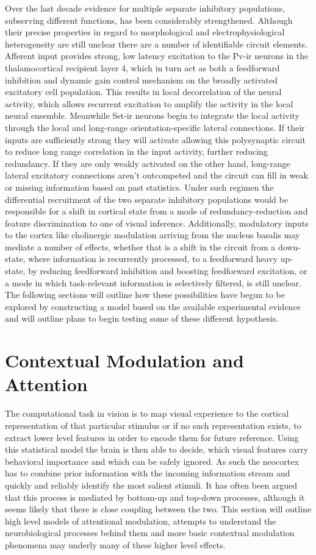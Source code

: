 Over the last decade evidence for multiple separate inhibitory
populations, subserving different functions, has been considerably
strengthened. Although their precise properties in regard to
morphological and electrophysiological heterogeneity are still unclear
there are a number of identifiable circuit elements. Afferent input
provides strong, low latency excitation to the Pv-ir neurons in the
thalamocortical recipient layer 4, which in turn act as both a
feedforward inhibition and dynamic gain control mechanism on the
broadly activated excitatory cell population. This results in local
decorrelation of the neural activity, which allows recurrent
excitation to amplify the activity in the local neural
ensemble. Meanwhile Sst-ir neurons begin to integrate the local
activity through the local and long-range orientation-specific lateral
connections. If their inputs are sufficiently strong they will
activate allowing this polysynaptic circuit to reduce long range
correlation in the input activity, further reducing redundancy. If
they are only weakly activated on the other hand, long-range lateral
excitatory connections aren't outcompeted and the circuit can fill in
weak or missing information based on past statistics. Under such
regimen the differential recruitment of the two separate inhibitory
populations would be responsible for a shift in cortical state from a
mode of redundancy-reduction and feature discrimination to one of
visual inference. Additionally, modulatory inputs to the cortex like
cholinergic modulation arriving from the nucleus basalis may mediate a
number of effects, whether that is a shift in the circuit from a
down-state, where information is recurrently processed, to a
feedforward heavy up-state, by reducing feedforward inhibition and
boosting feedforward excitation, or a mode in which task-relevant
information is selectively filtered, is still unclear. The following
sections will outline how these possibilities have begun to be
explored by constructing a model based on the available experimental
evidence and will outline plans to begin testing some of these
different hypothesis.

\section{Contextual Modulation and Attention}

The computational task in vision is to map visual experience to the
cortical representation of that particular stimulus or if no such
representation exists, to extract lower level features in order to
encode them for future reference. Using this statistical model the
brain is then able to decide, which visual features carry behavioral
importance and which can be safely ignored. As such the neocortex has
to combine prior information with the incoming information stream and
quickly and reliably identify the most salient stimuli. It has often
been argued that this process is mediated by bottom-up and top-down
processes, although it seems likely that there is close coupling
between the two. This section will outline high level models of
attentional modulation, attempts to understand the neurobiological
processes behind them and more basic contextual modulation phenomena
may underly many of these higher level effects.

